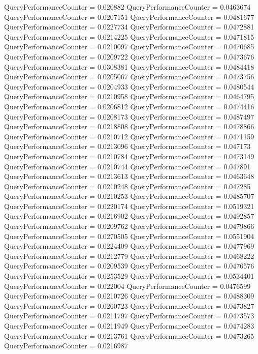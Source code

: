 \documentclass[9pt]{article}
\theoremstyle{plain}
\theoremstyle{definition}
\theoremstyle{remark}
\numberwithin{equation}{section}
\begin{document}
QueryPerformanceCounter  =  0.020882
QueryPerformanceCounter  =  0.0463674
QueryPerformanceCounter  =  0.0207151
QueryPerformanceCounter  =  0.0481677
QueryPerformanceCounter  =  0.0227734
QueryPerformanceCounter  =  0.0472881
QueryPerformanceCounter  =  0.0214225
QueryPerformanceCounter  =  0.0471815
QueryPerformanceCounter  =  0.0210097
QueryPerformanceCounter  =  0.0470685
QueryPerformanceCounter  =  0.0209722
QueryPerformanceCounter  =  0.0473676
QueryPerformanceCounter  =  0.0308381
QueryPerformanceCounter  =  0.0484418
QueryPerformanceCounter  =  0.0205067
QueryPerformanceCounter  =  0.0473756
QueryPerformanceCounter  =  0.0204933
QueryPerformanceCounter  =  0.0480544
QueryPerformanceCounter  =  0.0210958
QueryPerformanceCounter  =  0.0464795
QueryPerformanceCounter  =  0.0206812
QueryPerformanceCounter  =  0.0474416
QueryPerformanceCounter  =  0.0208173
QueryPerformanceCounter  =  0.0487497
QueryPerformanceCounter  =  0.0218808
QueryPerformanceCounter  =  0.0478866
QueryPerformanceCounter  =  0.0210712
QueryPerformanceCounter  =  0.0471159
QueryPerformanceCounter  =  0.0213096
QueryPerformanceCounter  =  0.047173
QueryPerformanceCounter  =  0.0210784
QueryPerformanceCounter  =  0.0473149
QueryPerformanceCounter  =  0.0210744
QueryPerformanceCounter  =  0.047891
QueryPerformanceCounter  =  0.0213613
QueryPerformanceCounter  =  0.0463648
QueryPerformanceCounter  =  0.0210248
QueryPerformanceCounter  =  0.047285
QueryPerformanceCounter  =  0.0210253
QueryPerformanceCounter  =  0.0485707
QueryPerformanceCounter  =  0.0220174
QueryPerformanceCounter  =  0.0519321
QueryPerformanceCounter  =  0.0216902
QueryPerformanceCounter  =  0.0492857
QueryPerformanceCounter  =  0.0209762
QueryPerformanceCounter  =  0.0479866
QueryPerformanceCounter  =  0.0270505
QueryPerformanceCounter  =  0.0551904
QueryPerformanceCounter  =  0.0224409
QueryPerformanceCounter  =  0.0477969
QueryPerformanceCounter  =  0.0212779
QueryPerformanceCounter  =  0.0468222
QueryPerformanceCounter  =  0.0209539
QueryPerformanceCounter  =  0.0476576
QueryPerformanceCounter  =  0.0253529
QueryPerformanceCounter  =  0.0534401
QueryPerformanceCounter  =  0.022004
QueryPerformanceCounter  =  0.0476599
QueryPerformanceCounter  =  0.0210726
QueryPerformanceCounter  =  0.0488309
QueryPerformanceCounter  =  0.0260723
QueryPerformanceCounter  =  0.0473827
QueryPerformanceCounter  =  0.0211797
QueryPerformanceCounter  =  0.0473573
QueryPerformanceCounter  =  0.0211949
QueryPerformanceCounter  =  0.0474283
QueryPerformanceCounter  =  0.0213761
QueryPerformanceCounter  =  0.0473265
QueryPerformanceCounter  =  0.0216987
\end{document}
